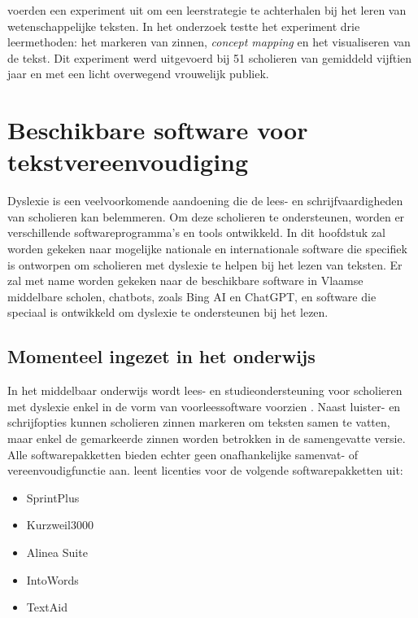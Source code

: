 
\textcite{Leopold2015} voerden een experiment uit om een leerstrategie te achterhalen bij het leren van wetenschappelijke teksten. In het onderzoek testte het experiment drie leermethoden: het markeren van zinnen, \textit{concept mapping} en het visualiseren van de tekst. Dit experiment werd uitgevoerd bij 51 scholieren van gemiddeld vijftien jaar en met een licht overwegend vrouwelijk publiek. %

\section{Beschikbare software voor tekstvereenvoudiging}

Dyslexie is een veelvoorkomende aandoening die de lees- en schrijfvaardigheden van scholieren kan belemmeren. Om deze scholieren te ondersteunen, worden er verschillende softwareprogramma's en tools ontwikkeld. In dit hoofdstuk zal worden gekeken naar mogelijke nationale en internationale software die specifiek is ontworpen om scholieren met dyslexie te helpen bij het lezen van teksten. Er zal met name worden gekeken naar de beschikbare software in Vlaamse middelbare scholen, chatbots, zoals Bing AI en ChatGPT, en software die speciaal is ontwikkeld om dyslexie te ondersteunen bij het lezen.

\subsection{Momenteel ingezet in het onderwijs}


In het middelbaar onderwijs wordt lees- en studieondersteuning voor scholieren met dyslexie enkel in de vorm van voorleessoftware voorzien \autocite{DeCraemer2018, OnderwijsVlaanderen2023}. Naast luister- en schrijfopties kunnen scholieren zinnen markeren om teksten samen te vatten, maar enkel de gemarkeerde zinnen worden betrokken in de samengevatte versie. Alle softwarepakketten bieden echter geen onafhankelijke samenvat- of vereenvoudigfunctie aan. \textcite{OnderwijsVlaanderen2023} leent licenties voor de volgende softwarepakketten uit:

\begin{itemize}
	\item SprintPlus
	\item Kurzweil3000
	\item Alinea Suite
	\item IntoWords
	\item TextAid
\end{itemize}

